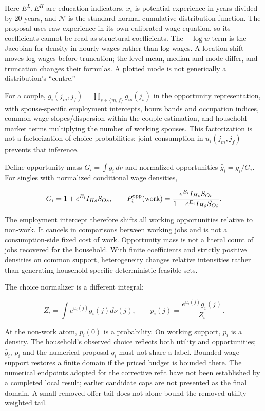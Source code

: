 \documentclass[11pt,a4paper]{article}
\begin{document}
Here \(E^L,E^H\) are education indicators, \(x_i\) is potential experience in years divided by 20 years, and \(\mathcal N\) is the standard normal cumulative distribution function. The proposal uses raw experience in its own calibrated wage equation, so its coefficients cannot be read as structural coefficients. The \(-\log w\) term is the Jacobian for density in hourly wages rather than log wages. A location shift moves log wages before truncation; the level mean, median and mode differ, and truncation changes their formulas. A plotted mode is not generically a distribution's ``centre.''

For a couple, \(g_i(j_m,j_f)=\prod_{s\in\{m,f\}}g_{is}(j_s)\) in the opportunity representation, with spouse-specific employment intercepts, hours bands and occupation indices, common wage slopes/dispersion within the couple estimation, and household market terms multiplying the number of working spouses. This factorization is not a factorization of choice probabilities: joint consumption in \(u_i(j_m,j_f)\) prevents that inference.

Define opportunity mass \(G_i=\int g_i\,d\nu\) and normalized opportunities \(\widehat g_i=g_i/G_i\). For singles with normalized conditional wage densities,

\[G_i=1+e^{E_i}I_{Hs}S_{Os},\qquad
P_i^{\rm opp}(\text{work})=\frac{e^{E_i}I_{Hs}S_{Os}}{1+e^{E_i}I_{Hs}S_{Os}}.\]

The employment intercept therefore shifts all working opportunities relative to non-work. It cancels in comparisons between working jobs and is not a consumption-side fixed cost of work. Opportunity mass is not a literal count of jobs recovered for the household. With finite coefficients and strictly positive densities on common support, heterogeneity changes relative intensities rather than generating household-specific deterministic feasible sets.

The choice normalizer is a different integral:

\[Z_i=\int e^{u_i(j)}g_i(j)d\nu(j),\qquad p_i(j)=\frac{e^{u_i(j)}g_i(j)}{Z_i}.\]

At the non-work atom, \(p_i(0)\) is a probability. On working support, \(p_i\) is a density. The household's observed choice reflects both utility and opportunities; \(\widehat g_i\), \(p_i\) and the numerical proposal \(q_i\) must not share a label. Bounded wage support restores a finite domain if the priced budget is bounded there. The numerical endpoints adopted for the corrective refit have not been established by a completed local result; earlier candidate caps are not presented as the final domain. A small removed offer tail does not alone bound the removed utility-weighted tail.
\end{document}
